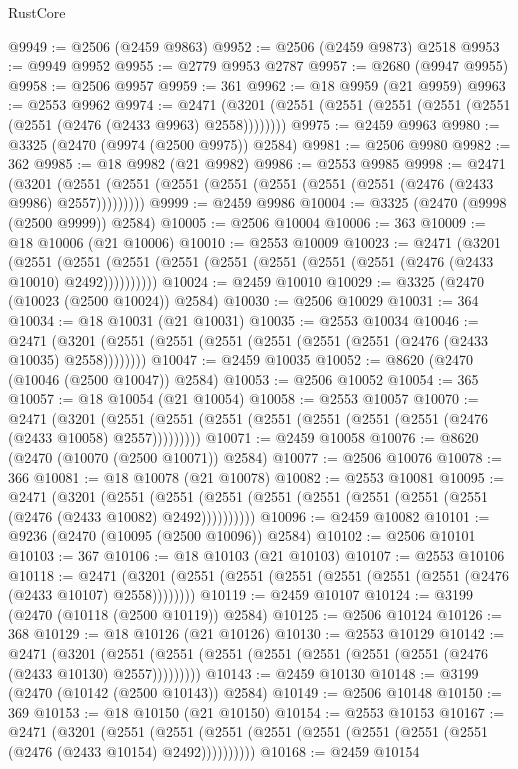 \begin{lexlean}{RustCore}
\begin{coremodule}
@9949 := @2506 (@2459 @9863)
@9952 := @2506 (@2459 @9873) @2518
@9953 := @9949 @9952
@9955 := @2779 @9953 @2787
@9957 := @2680 (@9947 @9955)
@9958 := @2506 @9957
@9959 := 361
@9962 := @18 @9959 (@21 @9959)
@9963 := @2553 @9962
@9974 := @2471 (@3201 (@2551 (@2551 (@2551 (@2551 (@2551 (@2551 (@2476 (@2433 @9963) @2558))))))))
@9975 := @2459 @9963
@9980 := @3325 (@2470 (@9974 (@2500 @9975)) @2584)
@9981 := @2506 @9980
@9982 := 362
@9985 := @18 @9982 (@21 @9982)
@9986 := @2553 @9985
@9998 := @2471
    (@3201 (@2551 (@2551 (@2551 (@2551 (@2551 (@2551 (@2551 (@2476 (@2433 @9986) @2557)))))))))
@9999 := @2459 @9986
@10004 := @3325 (@2470 (@9998 (@2500 @9999)) @2584)
@10005 := @2506 @10004
@10006 := 363
@10009 := @18 @10006 (@21 @10006)
@10010 := @2553 @10009
@10023 := @2471
    (@3201
      (@2551 (@2551 (@2551 (@2551 (@2551 (@2551 (@2551 (@2551 (@2476 (@2433 @10010) @2492))))))))))
@10024 := @2459 @10010
@10029 := @3325 (@2470 (@10023 (@2500 @10024)) @2584)
@10030 := @2506 @10029
@10031 := 364
@10034 := @18 @10031 (@21 @10031)
@10035 := @2553 @10034
@10046 := @2471 (@3201 (@2551 (@2551 (@2551 (@2551 (@2551 (@2551 (@2476 (@2433 @10035) @2558))))))))
@10047 := @2459 @10035
@10052 := @8620 (@2470 (@10046 (@2500 @10047)) @2584)
@10053 := @2506 @10052
@10054 := 365
@10057 := @18 @10054 (@21 @10054)
@10058 := @2553 @10057
@10070 := @2471
    (@3201 (@2551 (@2551 (@2551 (@2551 (@2551 (@2551 (@2551 (@2476 (@2433 @10058) @2557)))))))))
@10071 := @2459 @10058
@10076 := @8620 (@2470 (@10070 (@2500 @10071)) @2584)
@10077 := @2506 @10076
@10078 := 366
@10081 := @18 @10078 (@21 @10078)
@10082 := @2553 @10081
@10095 := @2471
    (@3201
      (@2551 (@2551 (@2551 (@2551 (@2551 (@2551 (@2551 (@2551 (@2476 (@2433 @10082) @2492))))))))))
@10096 := @2459 @10082
@10101 := @9236 (@2470 (@10095 (@2500 @10096)) @2584)
@10102 := @2506 @10101
@10103 := 367
@10106 := @18 @10103 (@21 @10103)
@10107 := @2553 @10106
@10118 := @2471 (@3201 (@2551 (@2551 (@2551 (@2551 (@2551 (@2551 (@2476 (@2433 @10107) @2558))))))))
@10119 := @2459 @10107
@10124 := @3199 (@2470 (@10118 (@2500 @10119)) @2584)
@10125 := @2506 @10124
@10126 := 368
@10129 := @18 @10126 (@21 @10126)
@10130 := @2553 @10129
@10142 := @2471
    (@3201 (@2551 (@2551 (@2551 (@2551 (@2551 (@2551 (@2551 (@2476 (@2433 @10130) @2557)))))))))
@10143 := @2459 @10130
@10148 := @3199 (@2470 (@10142 (@2500 @10143)) @2584)
@10149 := @2506 @10148
@10150 := 369
@10153 := @18 @10150 (@21 @10150)
@10154 := @2553 @10153
@10167 := @2471
    (@3201
      (@2551 (@2551 (@2551 (@2551 (@2551 (@2551 (@2551 (@2551 (@2476 (@2433 @10154) @2492))))))))))
@10168 := @2459 @10154

\end{coremodule}
\end{lexlean}
